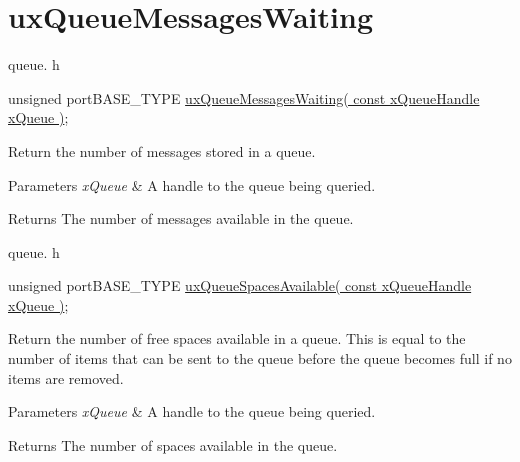 \hypertarget{group__uxQueueMessagesWaiting}{}\section{ux\+Queue\+Messages\+Waiting}
\label{group__uxQueueMessagesWaiting}
queue. h 
\begin{DoxyPre}unsigned portBASE\_TYPE \hyperlink{queue_8h_a70075cb97b8b84e947a169f3123f78a6}{uxQueueMessagesWaiting( const xQueueHandle xQueue )};\end{DoxyPre}


Return the number of messages stored in a queue.


\begin{DoxyParams}{Parameters}
{\em x\+Queue} & A handle to the queue being queried.\\
\hline
\end{DoxyParams}
\begin{DoxyReturn}{Returns}
The number of messages available in the queue.
\end{DoxyReturn}
queue. h 
\begin{DoxyPre}unsigned portBASE\_TYPE \hyperlink{queue_8h_a8a887a95a919759fd6b8439d67ea87bb}{uxQueueSpacesAvailable( const xQueueHandle xQueue )};\end{DoxyPre}


Return the number of free spaces available in a queue. This is equal to the number of items that can be sent to the queue before the queue becomes full if no items are removed.


\begin{DoxyParams}{Parameters}
{\em x\+Queue} & A handle to the queue being queried.\\
\hline
\end{DoxyParams}
\begin{DoxyReturn}{Returns}
The number of spaces available in the queue. 
\end{DoxyReturn}
